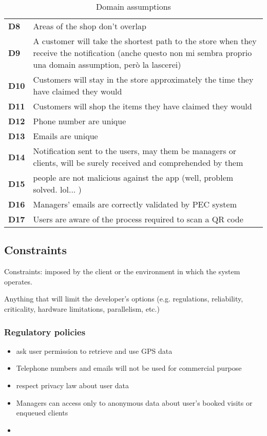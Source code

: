 \begin{table}[h!]
\begin{tabular}{@{}P{0.1\textwidth}P{0.80\textwidth}@{}}
        \textbf{D8}       & Areas of the shop don’t overlap\\
        \textbf{D9}       & A customer will take the shortest path to the store when they receive the notification (anche questo non mi sembra proprio una domain assumption, però la lascerei)\\
        \textbf{D10}       & Customers will stay in the store approximately the time they have claimed they would\\
        \textbf{D11}       & Customers will shop the items they have claimed they would\\
        \textbf{D12}       & Phone number are unique\\
        \textbf{D13}       & Emails are unique\\
        \textbf{D14}       & Notification sent to the users, may them be managers or clients, will be surely received and comprehended by them\\
        \textbf{D15}       &  people are not malicious against the app (well, problem solved. lol... )\\
        \textbf{D16}       & Managers' emails are correctly validated by PEC system\\
        \textbf{D17}       & Users are aware of the process required to scan a QR code\\
        \bottomrule
    \end{tabular}
\caption{Domain assumptions}
\label{table:domainassumptions}
\end{table}

\subsection{Constraints}
\label{subsect:contraints}

Constraints: imposed by the client or the environment in which the system operates. 

Anything that will limit the developer’s options (e.g. regulations, reliability, criticality, hardware limitations, parallelism, etc.)

\subsubsection{Regulatory policies}
\label{subsubsect:regulatorypolicies}

\begin{itemize}
    \item ask user permission to retrieve and use GPS data
    \item Telephone numbers and emails will not be used for commercial purpose
    \item respect privacy law about user data
    \item Managers can access only to anonymous data about user's booked visits or enqueued clients
    \item 
\end{itemize}

